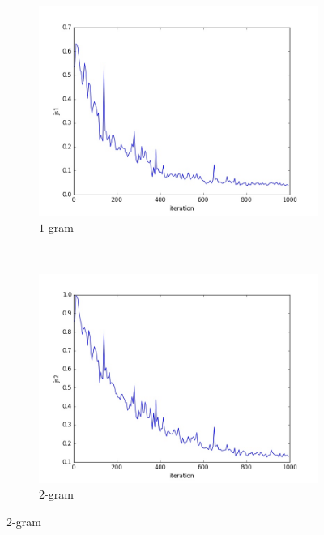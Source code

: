 \documentclass[10pt,a4paper]{article}
\begin{document}
\begin{figure}[H]
    \centering
    \begin{subfigure}[b]{0.4\textwidth}
        \includegraphics[width=\textwidth]{quora/js1}
        \caption{$1$-gram}
    \end{subfigure}
    ~ 
    \begin{subfigure}[b]{0.4\textwidth}
        \includegraphics[width=\textwidth]{quora/js2}
        \caption{$2$-gram}
    \end{subfigure}
    

\end{figure}
\end{document}
